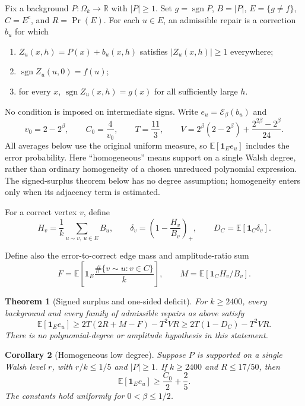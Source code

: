 \documentclass[11pt]{article}
\newtheorem{theorem}{Theorem}
\newtheorem{corollary}[theorem]{Corollary}
\newcommand{\E}{\mathbb E}
\newcommand{\1}{\mathbf 1}
\newcommand{\cE}{\mathcal E}
\DeclareMathOperator{\sgn}{sgn}
\begin{document}
Fix a background $P:\Omega_k\to\mathbb R$ with $|P|\ge1$. Set
$g=\sgn P$, $B=|P|$, $E=\{g\ne f\}$, $C=E^c$, and $R=\Pr(E)$.
For each $u\in E$, an admissible repair is a correction $b_u$ for which
\begin{enumerate}
\item $Z_u(x,h)=P(x)+b_u(x,h)$ satisfies $|Z_u(x,h)|\ge1$ everywhere;
\item $\sgn Z_u(u,0)=f(u)$;
\item for every $x$, $\sgn Z_u(x,h)=g(x)$ for all sufficiently large $h$.
\end{enumerate}
No condition is imposed on intermediate signs. Write
$e_u=\cE_\beta(b_u)$ and
\[
 v_0=2-2^\beta,\qquad C_0=\frac4{v_0},\qquad T=\frac{11}{3},
 \qquad V=2^\beta(2-2^\beta)+\frac{2^{2\beta}-2^\beta}{24}.
\]
All averages below use the original uniform measure, so
$\E[\1_E e_u]$ includes the error probability. Here ``homogeneous''
means support on a single Walsh degree, rather than ordinary homogeneity
of a chosen unreduced polynomial expression. The signed-surplus theorem
below has no degree assumption; homogeneity enters only when its
adjacency term is estimated.

For a correct vertex $v$, define
\begin{equation}\label{eq:deficit}
 H_v=\frac1k\sum_{u\sim v,\ u\in E}B_u,
 \qquad \delta_v=\left(1-\frac{H_v}{B_v}\right)_+,
 \qquad D_C=\E[\1_C\delta_v].
\end{equation}

Define also the error-to-correct edge mass and amplitude-ratio sum
\[
 F=\E\left[\1_E\frac{\#\{v\sim u:v\in C\}}k\right],
 \qquad M=\E[\1_C H_v/B_v].
\]

\begin{theorem}[Signed surplus and one-sided deficit]\label{thm:deficit}
For $k\ge2400$, every background and every family of admissible repairs
as above satisfy
\begin{equation}\label{eq:main-deficit}
 \E[\1_Ee_u]\ge2T(2R+M-F)-T^2VR
                  \ge2T(1-D_C)-T^2VR.
\end{equation}
There is no polynomial-degree or amplitude hypothesis in this statement.
\end{theorem}

\begin{corollary}[Homogeneous low degree]\label{cor:homogeneous}
Suppose $P$ is supported on a single Walsh level $r$, with
$r/k\le1/5$ and $|P|\ge1$. If $k\ge2400$ and $R\le17/50$, then
\begin{equation}\label{eq:homogeneous}
 \E[\1_Ee_u]\ge\frac{C_0}{2}+\frac25.
\end{equation}
The constants hold uniformly for $0<\beta\le1/2$.
\end{corollary}
\end{document}
